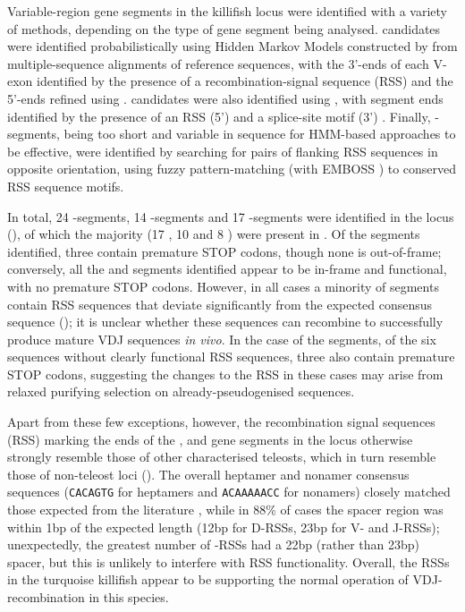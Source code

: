 Variable-region gene segments in the killifish \igh{} locus were identified with a variety of methods, depending on the type of gene segment being analysed. \vh candidates were identified probabilistically using Hidden Markov Models constructed by  \parencite{wheeler2013nhmmer} from  \parencite{loytynoja2014prank} multiple-sequence alignments of reference sequences, with the 3'-ends of each V-exon identified by the presence of a recombination-signal sequence (RSS) \parencite{schroeder2010immunoglobulins} and the 5'-ends refined using  \parencite{ehrenmann2011domaingapalign}. \jh candidates were also identified using , with segment ends identified by the presence of an RSS (5') and a  splice-site motif (3') \parencite{magadan2011medaka}. Finally, \dh-segments, being too short and variable in sequence for HMM-based approaches to be effective, were identified by searching for pairs of flanking RSS sequences in opposite orientation, using fuzzy pattern-matching (with EMBOSS  \parencite{rice2000emboss}) to conserved RSS sequence motifs.
	 
In total, 24 \vh-segments, 14 \dh-segments and 17 \jh-segments were identified in the \Nfu locus (), of which the majority (17 \vh, 10 \dh and 8 \jh) were present in . Of the \vh segments identified, three contain premature STOP codons, though none is out-of-frame; conversely, all the \dh and \jh segments identified appear to be in-frame and functional, with no premature STOP codons. However, in all cases a minority of segments contain RSS sequences that deviate significantly from the expected consensus sequence (); it is unclear whether these sequences can recombine to successfully produce mature VDJ sequences \textit{in vivo}. In the case of the \vh segments, of the six sequences without clearly functional RSS sequences, three also contain premature STOP codons, suggesting the changes to the RSS in these cases may arise from relaxed purifying selection on already-pseudogenised sequences.

Apart from these few exceptions, however, the recombination signal sequences (RSS) marking the ends of the \vh, \dh and \jh gene segments in the \Nfu locus otherwise strongly resemble those of other characterised teleosts, which in turn resemble those of non-teleost loci (). The overall heptamer and nonamer consensus sequences (\texttt{CACAGTG} for heptamers and \texttt{ACAAAAACC} for nonamers) closely matched those expected from the literature \parencite{schroeder2010immunoglobulins}, while in 88\% of cases the spacer region was within 1bp of the expected length (12bp for D-RSSs, 23bp for V- and J-RSSs); unexpectedly, the greatest number of \vh-RSSs had a 22bp (rather than 23bp) spacer, but this is unlikely to interfere with RSS functionality. Overall, the RSSs in the turquoise killifish appear to be supporting the normal operation of VDJ-recombination in this species.


